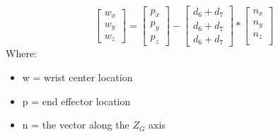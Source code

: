 \documentclass{article}
\begin{document}
\[
\begin{bmatrix}
    w_x \\
    w_y \\
    w_z
\end{bmatrix}
=
\begin{bmatrix}
    p_x \\
    p_y \\
    p_z
\end{bmatrix}
-
\begin{bmatrix}
    d_6 + d_7 \\
    d_6 + d_7 \\
    d_6 + d_7
\end{bmatrix}
*
\begin{bmatrix}
    n_x \\
    n_y \\
    n_z \\
\end{bmatrix}    
\]
Where:
\begin{itemize}
    \item w = wrist center location
    \item p = end effector location
    \item n = the vector along the $Z_G$ axis
\end{itemize}
\end{document}
